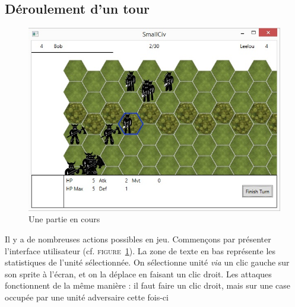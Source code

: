 \subsection{Déroulement d'un tour}
\begin{figure}
	\centering
	\includegraphics{img/jeu.jpg}
	\caption{Une partie en cours}
	\label{in_game}
\end{figure}
Il y a de nombreuses actions possibles en jeu. Commençons par présenter l'interface utilisateur (cf. \textsc{figure~\ref{in_game}}). La zone de texte en bas représente les statistiques de l'unité sélectionnée. On sélectionne unité \textit{via} un clic gauche sur son sprite à l'écran, et on la déplace en faisant un clic droit. Les attaques fonctionnent de la même manière : il faut faire un clic droit, mais sur une case occupée par une unité adversaire cette fois-ci